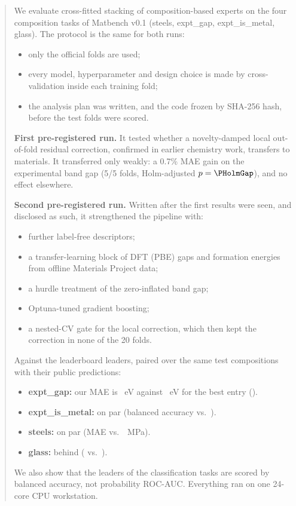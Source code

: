 \begin{abstract}
We evaluate cross-fitted stacking of composition-based experts on the four composition tasks of Matbench v0.1 (steels, expt\_gap, expt\_is\_metal, glass).
The protocol is the same for both runs:
\begin{itemize}
\item only the official folds are used;
\item every model, hyperparameter and design choice is made by cross-validation inside each training fold;
\item the analysis plan was written, and the code frozen by SHA-256 hash, before the test folds were scored.
\end{itemize}

\textbf{First pre-registered run.} It tested whether a novelty-damped local out-of-fold residual correction, confirmed in earlier chemistry work, transfers to materials. It transferred only weakly: a 0.7\% MAE gain on the experimental band gap (5/5 folds, Holm-adjusted $p=\PHolmGap$), and no effect elsewhere.

\textbf{Second pre-registered run.} Written after the first results were seen, and disclosed as such, it strengthened the pipeline with:
\begin{itemize}
\item further label-free descriptors;
\item a transfer-learning block of DFT (PBE) gaps and formation energies from offline Materials Project data;
\item a hurdle treatment of the zero-inflated band gap;
\item Optuna-tuned gradient boosting;
\item a nested-CV gate for the local correction, which then kept the correction in none of the 20 folds.
\end{itemize}

Against the leaderboard leaders, paired over the same test compositions with their public predictions:
\begin{itemize}
\item \textbf{expt\_gap:} our MAE is \AtwoFinalGap{}~eV against \AtwoLeaderGap{}~eV for the best entry (\AtwoPHolmExprGap).
\item \textbf{expt\_is\_metal:} on par (balanced accuracy \AtwoFinalMetal{} vs.\ \AtwoLeaderMetal).
\item \textbf{steels:} on par (MAE \AtwoFinalSteels{} vs.\ \AtwoLeaderSteels~MPa).
\item \textbf{glass:} behind (\AtwoFinalGlass{} vs.\ \AtwoLeaderGlass).
\end{itemize}
We also show that the leaders of the classification tasks are scored by balanced accuracy, not probability ROC-AUC.
Everything ran on one 24-core CPU workstation.
\end{abstract}
